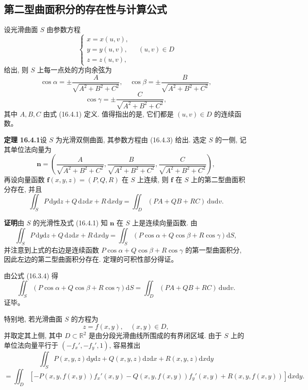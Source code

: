 \documentclass[UTF8, 12pt, fontset=fandol, oneside]{ctexart}
\begin{document}
\subsection{第二型曲面积分的存在性与计算公式}

设光滑曲面 $S$ 由参数方程
\begin{equation}
  \begin{cases}
    x=x(u,v),\\
    y=y(u,v),\\
    z=z(u,v),
  \end{cases}\quad (u,v)\in D
  \tag{16.4.3}
\end{equation}
给出, 则 $S$ 上每一点处的方向余弦为
\[
  \cos\alpha=\pm\frac{A}{\sqrt{A^2+B^2+C^2}},\quad
  \cos\beta=\pm\frac{B}{\sqrt{A^2+B^2+C^2}},
\]
\[
  \cos\gamma=\pm\frac{C}{\sqrt{A^2+B^2+C^2}},
\]
其中 $A,B,C$ 由式 (16.4.1) 定义. 值得指出的是, 它们都是 $(u,v)\in D$ 的连续函数。

\noindent\textbf{定理 16.4.1}\quad 设 $S$ 为光滑双侧曲面, 其参数方程由 (16.4.3) 给出. 选定 $S$ 的一侧, 记其单位法向量为
\[
  \boldsymbol n=\left(
    \frac{A}{\sqrt{A^2+B^2+C^2}},
    \frac{B}{\sqrt{A^2+B^2+C^2}},
    \frac{C}{\sqrt{A^2+B^2+C^2}}
  \right),
\]
再设向量函数 $\boldsymbol f(x,y,z)=(P,Q,R)$ 在 $S$ 上连续, 则 $\boldsymbol f$ 在 $S$ 上的第二型曲面积分存在, 并且
\[
  \iint_S P\,\mathrm dy\mathrm dz+Q\,\mathrm dz\mathrm dx+R\,\mathrm dx\mathrm dy
  =\iint_D(PA+QB+RC)\,\mathrm du\mathrm dv.
\]

\noindent\textbf{证明}\quad 由 $S$ 的光滑性及式 (16.4.1) 知 $\boldsymbol n$ 在 $S$ 上是连续向量函数. 由
\begin{equation}
  \iint_S P\,\mathrm dy\mathrm dz+Q\,\mathrm dz\mathrm dx+R\,\mathrm dx\mathrm dy
  =\iint_S(P\cos\alpha+Q\cos\beta+R\cos\gamma)\mathrm dS,
  \tag{16.4.4}
\end{equation}
并注意到上式的右边是连续函数 $P\cos\alpha+Q\cos\beta+R\cos\gamma$ 的第一型曲面积分, 因此左边的第二型曲面积分存在. 定理的可积性部分得证。

由公式 (16.3.4) 得
\[
  \iint_S(P\cos\alpha+Q\cos\beta+R\cos\gamma)\mathrm dS
  =\iint_D(PA+QB+RC)\,\mathrm du\mathrm dv.
\]
证毕。

特别地, 若光滑曲面 $S$ 的方程为
\[
  z=f(x,y),\quad (x,y)\in D,
\]
并取定其上侧, 其中 $D\subset\mathbb R^2$ 是由分段光滑曲线所围成的有界闭区域. 由于 $S$ 上的单位法向量平行于 $(-f_x',-f_y',1)$, 容易推出
\[
  \iint_S P(x,y,z)\mathrm dy\mathrm dz+Q(x,y,z)\mathrm dz\mathrm dx+R(x,y,z)\mathrm dx\mathrm dy
\]
\[
  =\iint_D[-P(x,y,f(x,y))f_x'(x,y)-Q(x,y,f(x,y))f_y'(x,y)
  +R(x,y,f(x,y))]\mathrm dx\mathrm dy.
\]
\end{document}
